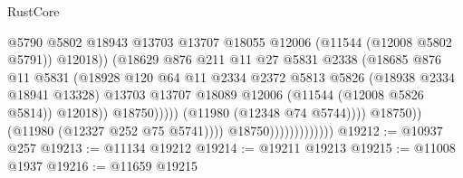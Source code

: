 \begin{lexlean}{RustCore}
\begin{coremodule}
                                                      @5790
                                                      @5802
                                                      @18943
                                                      @13703
                                                      @13707
                                                      @18055
                                                      @12006
                                                      (@11544 (@12008 @5802 @5791))
                                                      @12018))
                                                  (@18629
                                                    @876
                                                    @211
                                                    @11
                                                    @27
                                                    @5831
                                                    @2338
                                                    (@18685
                                                      @876
                                                      @11
                                                      @5831
                                                      (@18928
                                                        @120
                                                        @64
                                                        @11
                                                        @2334
                                                        @2372
                                                        @5813
                                                        @5826
                                                        (@18938 @2334 @18941 @13328)
                                                        @13703
                                                        @13707
                                                        @18089
                                                        @12006
                                                        (@11544 (@12008 @5826 @5814))
                                                        @12018))
                                                    @18750)))))
                                          (@11980 (@12348 @74 @5744))))
                                      @18750))
                                  (@11980 (@12327 @252 @75 @5741))))
                              @18750)))))))))))))
@19212 := @10937 @257
@19213 := @11134 @19212
@19214 := @19211 @19213
@19215 := @11008 @1937
@19216 := @11659 @19215

\end{coremodule}
\end{lexlean}

